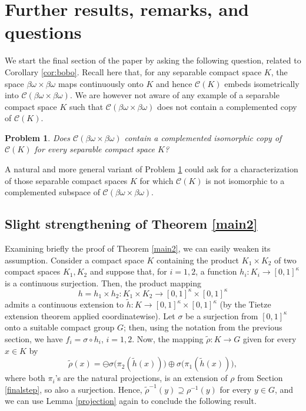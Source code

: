 \documentclass[12pt,fleqn]{amsart}
\numberwithin{equation}{section}
\newtheorem{prob}[thm]{Problem}
\theoremstyle{definition}
\def\C{\mathcal C}
\newcommand{\bobo}{\beta\omega\times\beta\omega}
\begin{document}
\section{Further results, remarks, and questions}

We start the final section of the paper by asking the following question, related to Corollary \ref{cor:bobo}. Recall here that, for any separable compact space $K$, the space $\bobo$ maps continuously onto $K$ and hence $\C(K)$ embeds isometrically into $\C(\bobo)$. We are however not aware of any example of a separable compact space $K$ such that $\C(\bobo)$ does not contain a complemented copy of $\C(K)$.

\begin{prob}\label{problem_example}
Does $\C(\bobo)$ contain a complemented isomorphic copy of $\C(K)$ for every separable compact space $K$?
\end{prob}

A natural and more general variant of Problem \ref{problem_example} could ask for a characterization of those separable compact spaces $K$ for which $\C(K)$ is not isomorphic to a complemented subspace of $\C(\bobo)$.

\subsection{Slight strengthening of Theorem \ref{main2}}

Examining briefly the proof of Theorem \ref{main2}, 
we can easily weaken its assumption. Consider a compact space $K$ containing the product
$K_1\times K_2$ of two compact spaces $K_1,K_2$ and suppose that, for $i=1,2$, a function $h_i\colon K_i\to [0,1]^\kappa$ is a continuous surjection.
Then, the product mapping \[ h=h_1\times h_2\colon  K_1\times K_2\to [0,1]^\kappa \times [0,1]^\kappa\]
 admits a
continuous extension to $\widetilde{h}\colon K\to [0,1]^\kappa \times [0,1]^\kappa$ (by
the Tietze extension theorem applied coordinatewise). Let $\sigma$ be a surjection from
$[0,1]^\kappa$ onto a suitable compact group $G$; then, using the notation from the previous section,
we have $f_i=\sigma\circ h_i$, $i=1,2$. Now, the mapping $\widetilde{\rho}\colon  K\to G$ given for every $x\in K$ by
\[\widetilde{\rho}(x)=\ominus \sigma\big(\pi_2(\widetilde{h}(x))\big) \oplus \sigma\big(\pi_1(\widetilde{h}(x))\big),\]
where both $\pi_i$'s are the natural projections, is an extension of $\rho$ from Section \ref{finalstep}, so also a surjection. Hence, $\widetilde{\rho}^{-1}(y)\supseteq \rho^{-1}(y)$ for every $y\in G$, and
we can use Lemma \ref{projection} again to conclude the following result.
\end{document}
